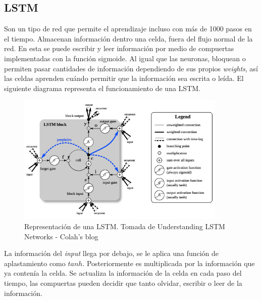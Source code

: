 \documentclass[12pt,spanish]{article}
\begin{document}
	\subsection{LSTM}
	Son un tipo de red que permite el aprendizaje incluso con más de 1000 pasos en el tiempo. Almacenan información dentro una celda, fuera del flujo normal de la red. En esta se puede escribir y leer información por medio de compuertas implementadas con la función sigmoide. Al igual que las neuronas, bloquean o permiten pasar cantidades de información dependiendo de sus propios \textit{weights}, así las celdas aprenden cuándo permitir que la información sea escrita o leída. El siguiente diagrama representa el funcionamiento de una LSTM.\\
	\begin{figure}[H]
		\centering
		\includegraphics[width=10cm]{Imagenes/lstm_structure.png}
		\begin{centering}
			\caption{Representación de una LSTM. Tomada de Understanding LSTM Networks - Colah's blog}
		\end{centering}
	\end{figure}
	La información del \textit{input} llega por debajo, se le aplica una función de aplastamiento como $tanh$. Posteriormente es multiplicada por la información que ya contenía la celda. Se actualiza la información de la celda en cada paso del tiempo, las compuertas pueden decidir que tanto olvidar, escribir o leer de la información.
\end{document}
